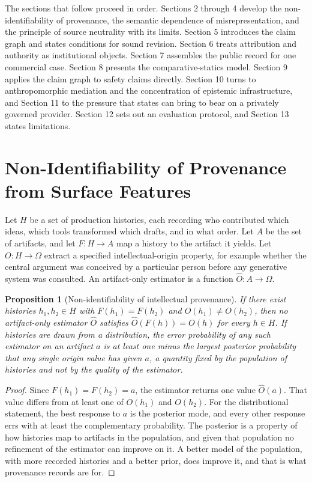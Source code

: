 \documentclass[12pt]{article}
\newtheorem{proposition}{Proposition}
\theoremstyle{definition}
\theoremstyle{remark}
\begin{document}
The sections that follow proceed in order. Sections 2 through 4 develop the non-identifiability of provenance, the semantic dependence of misrepresentation, and the principle of source neutrality with its limits. Section 5 introduces the claim graph and states conditions for sound revision. Section 6 treats attribution and authority as institutional objects. Section 7 assembles the public record for one commercial case. Section 8 presents the comparative-statics model. Section 9 applies the claim graph to safety claims directly. Section 10 turns to anthropomorphic mediation and the concentration of epistemic infrastructure, and Section 11 to the pressure that states can bring to bear on a privately governed provider. Section 12 sets out an evaluation protocol, and Section 13 states limitations.

\section{Non-Identifiability of Provenance from Surface Features}

Let $H$ be a set of production histories, each recording who contributed which ideas, which tools transformed which drafts, and in what order. Let $A$ be the set of artifacts, and let $F:H\to A$ map a history to the artifact it yields. Let $O:H\to\Omega$ extract a specified intellectual-origin property, for example whether the central argument was conceived by a particular person before any generative system was consulted. An artifact-only estimator is a function $\hat O:A\to\Omega$.

\begin{proposition}[Non-identifiability of intellectual provenance]
\label{prop:nonid}
If there exist histories $h_1,h_2\in H$ with $F(h_1)=F(h_2)$ and $O(h_1)\neq O(h_2)$, then no artifact-only estimator $\hat O$ satisfies $\hat O(F(h))=O(h)$ for every $h\in H$. If histories are drawn from a distribution, the error probability of any such estimator on an artifact $a$ is at least one minus the largest posterior probability that any single origin value has given $a$, a quantity fixed by the population of histories and not by the quality of the estimator.
\end{proposition}

\begin{proof}
Since $F(h_1)=F(h_2)=a$, the estimator returns one value $\hat O(a)$. That value differs from at least one of $O(h_1)$ and $O(h_2)$. For the distributional statement, the best response to $a$ is the posterior mode, and every other response errs with at least the complementary probability. The posterior is a property of how histories map to artifacts in the population, and given that population no refinement of the estimator can improve on it. A better model of the population, with more recorded histories and a better prior, does improve it, and that is what provenance records are for. \qedhere
\end{proof}
\end{document}
